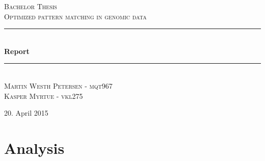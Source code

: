 \documentclass[12pt]{article}
\newcommand{\HRule}{\rule{\linewidth}{0.5mm}}
\begin{document}
\begin{titlepage}
\begin{center}

\textsc{\Large Bachelor Thesis \\ Optimized pattern matching in genomic data\\[0.3cm]}
\HRule \\[0.4cm]
{ \LARGE \bfseries Report}\\[0.4cm]
\HRule \\[1.2cm]
\textsc{\large Martin Westh Petersen - mqt967 \\ Kasper Myrtue - vkl275}\\[1.0cm]
\end{center}
\begin{center}
\vfill
{\large 20. April 2015}
\end{center}
\end{titlepage}
\tableofcontents

\section{Analysis}
\end{document}

